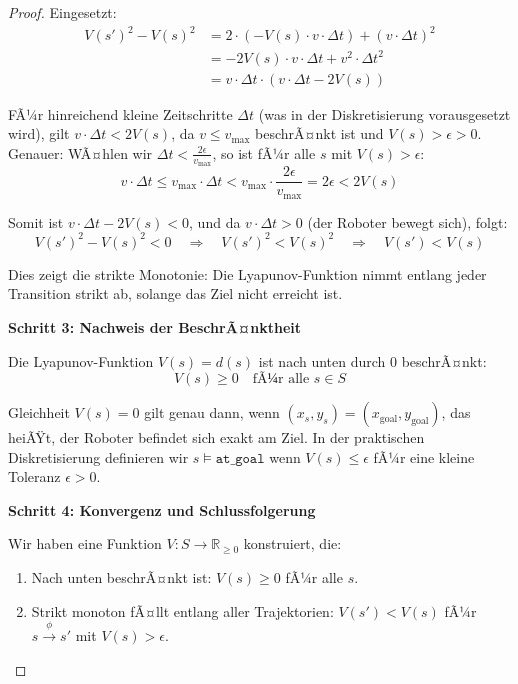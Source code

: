 ﻿\documentclass[a4paper,12pt]{article}
\theoremstyle{definition}
\begin{document}
\begin{proof}
Eingesetzt:
\begin{align}
V(s')^2 - V(s)^2 &= 2 \cdot (-V(s) \cdot v \cdot \Delta t) + (v \cdot \Delta t)^2 \\
&= -2 V(s) \cdot v \cdot \Delta t + v^2 \cdot \Delta t^2 \\
&= v \cdot \Delta t \cdot (v \cdot \Delta t - 2 V(s))
\end{align}

FÃ¼r hinreichend kleine Zeitschritte $\Delta t$ (was in der Diskretisierung vorausgesetzt wird), gilt $v \cdot \Delta t < 2 V(s)$, da $v \leq v_{\max}$ beschrÃ¤nkt ist und $V(s) > \epsilon > 0$. Genauer: WÃ¤hlen wir $\Delta t < \frac{2\epsilon}{v_{\max}}$, so ist fÃ¼r alle $s$ mit $V(s) > \epsilon$:
\begin{equation}
v \cdot \Delta t \leq v_{\max} \cdot \Delta t < v_{\max} \cdot \frac{2\epsilon}{v_{\max}} = 2\epsilon < 2V(s)
\end{equation}

Somit ist $v \cdot \Delta t - 2V(s) < 0$, und da $v \cdot \Delta t > 0$ (der Roboter bewegt sich), folgt:
\begin{equation}
V(s')^2 - V(s)^2 < 0 \quad \Rightarrow \quad V(s')^2 < V(s)^2 \quad \Rightarrow \quad V(s') < V(s)
\end{equation}

Dies zeigt die strikte Monotonie: Die Lyapunov-Funktion nimmt entlang jeder Transition strikt ab, solange das Ziel nicht erreicht ist.

\textbf{Schritt 3: Nachweis der BeschrÃ¤nktheit}

Die Lyapunov-Funktion $V(s) = d(s)$ ist nach unten durch 0 beschrÃ¤nkt:
\begin{equation}
V(s) \geq 0 \quad \text{fÃ¼r alle } s \in S
\end{equation}

Gleichheit $V(s) = 0$ gilt genau dann, wenn $(x_s, y_s) = (x_{\text{goal}}, y_{\text{goal}})$, das heiÃŸt, der Roboter befindet sich exakt am Ziel. In der praktischen Diskretisierung definieren wir $s \models \texttt{at\_goal}$ wenn $V(s) \leq \epsilon$ fÃ¼r eine kleine Toleranz $\epsilon > 0$.

\textbf{Schritt 4: Konvergenz und Schlussfolgerung}

Wir haben eine Funktion $V: S \to \mathbb{R}_{\geq 0}$ konstruiert, die:
\begin{enumerate}
\item Nach unten beschrÃ¤nkt ist: $V(s) \geq 0$ fÃ¼r alle $s$.
\item Strikt monoton fÃ¤llt entlang aller Trajektorien: $V(s') < V(s)$ fÃ¼r $s \xrightarrow{\phi} s'$ mit $V(s) > \epsilon$.
\end{enumerate}


\end{proof}
\end{document}

